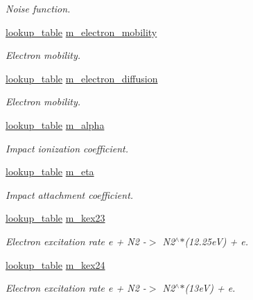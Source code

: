 \begin{DoxyCompactItemize}
\begin{DoxyCompactList}\small\item\em Noise function. \end{DoxyCompactList}\item 
\hyperlink{classlookup__table}{lookup\+\_\+table} \hyperlink{classair__bolsig_aa5bd233930889b89de840527be0d0238}{m\+\_\+electron\+\_\+mobility}
\begin{DoxyCompactList}\small\item\em Electron mobility. \end{DoxyCompactList}\item 
\hyperlink{classlookup__table}{lookup\+\_\+table} \hyperlink{classair__bolsig_a31fb3dcd9d0361d5e5976d42a34896de}{m\+\_\+electron\+\_\+diffusion}
\begin{DoxyCompactList}\small\item\em Electron mobility. \end{DoxyCompactList}\item 
\hyperlink{classlookup__table}{lookup\+\_\+table} \hyperlink{classair__bolsig_a0eaef65d6cadae8030e9efae37b37081}{m\+\_\+alpha}
\begin{DoxyCompactList}\small\item\em Impact ionization coefficient. \end{DoxyCompactList}\item 
\hyperlink{classlookup__table}{lookup\+\_\+table} \hyperlink{classair__bolsig_a237f6d1b4a6c325d04516e9bd4e13b70}{m\+\_\+eta}
\begin{DoxyCompactList}\small\item\em Impact attachment coefficient. \end{DoxyCompactList}\item 
\hyperlink{classlookup__table}{lookup\+\_\+table} \hyperlink{classair__bolsig_a8884012c873197f7521baf52835c8dd4}{m\+\_\+kex23}
\begin{DoxyCompactList}\small\item\em Electron excitation rate e + N2 -\/$>$ N2$^\wedge$$\ast$(12.\+25eV) + e. \end{DoxyCompactList}\item 
\hyperlink{classlookup__table}{lookup\+\_\+table} \hyperlink{classair__bolsig_af2f9493d680a1b101ec46fea917a37a9}{m\+\_\+kex24}
\begin{DoxyCompactList}\small\item\em Electron excitation rate e + N2 -\/$>$ N2$^\wedge$$\ast$(13eV) + e. \end{DoxyCompactList}\item 

\end{DoxyCompactItemize}
